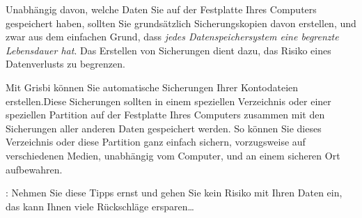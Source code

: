Unabhängig davon, welche Daten Sie auf der Festplatte Ihres Computers gespeichert haben, sollten Sie grundsätzlich Sicherungskopien davon erstellen, und zwar aus dem einfachen Grund, dass \emph{jedes Datenspeichersystem eine begrenzte Lebensdauer hat}. Das Erstellen von Sicherungen dient dazu, das Risiko eines Datenverlusts zu begrenzen.

Mit Grisbi können Sie automatische Sicherungen Ihrer Kontodateien erstellen.Diese Sicherungen sollten in einem speziellen Verzeichnis oder einer speziellen \gls{Partition} auf der Festplatte Ihres Computers zusammen mit den Sicherungen aller anderen Daten gespeichert werden. So können Sie dieses Verzeichnis oder diese Partition ganz einfach sichern, vorzugsweise auf verschiedenen Medien, unabhängig vom Computer, und an einem sicheren Ort aufbewahren. 

\Note{}: Nehmen Sie diese Tipps ernst und gehen Sie kein Risiko mit Ihren Daten ein, das kann Ihnen viele Rückschläge ersparen\ldots

